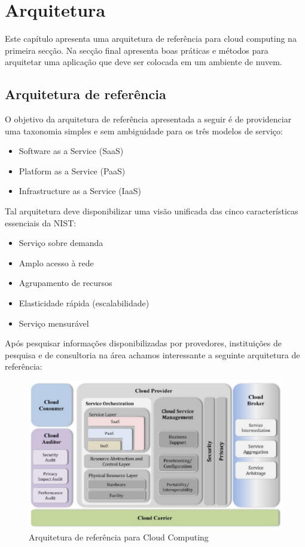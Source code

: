 \chapter{Arquitetura}
	Este capítulo apresenta uma arquitetura de referência para cloud computing na primeira secção. Na secção final apresenta boas práticas e métodos para arquitetar uma aplicação que deve ser colocada em um ambiente de nuvem.

\section{Arquitetura de referência}
	O objetivo da arquitetura de referência apresentada a seguir é de providenciar uma taxonomia simples e sem ambiguidade para os três modelos de serviço:
	\begin{itemize}
		\item
			Software as a Service (SaaS)
		\item
			Platform as a Service (PaaS)
		\item
			Infrastructure as a Service (IaaS)
	\end{itemize}

	Tal arquitetura deve disponibilizar uma visão unificada das cinco características essenciais da NIST:
	\begin{itemize}
		\item
			Serviço sobre demanda
		\item
			Amplo acesso à rede
		\item
			Agrupamento de recursos
		\item
			Elasticidade rápida (escalabilidade)
		\item
			Serviço mensurável
	\end{itemize}

	Após pesquisar informações disponibilizadas por provedores, instituições de pesquisa e de consultoria na área achamos interessante a seguinte arquitetura de referência:

	\begin{figure}[h!]
  	\centering
  	\includegraphics[scale=0.5]{imagens/cloudarch.eps}
  	\caption{Arquitetura de referência para Cloud Computing}
	\end{figure}

